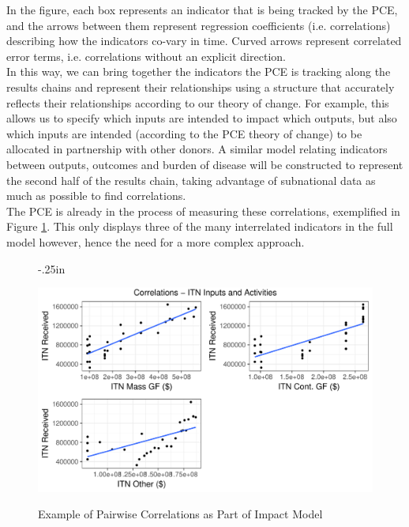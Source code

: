 \documentclass[twocolumn]{bmcart}%
\begin{document}
In the figure, each box represents an indicator that is being tracked by the PCE, and the arrows between them represent regression coefficients (i.e. correlations) describing how the indicators co-vary in time. Curved arrows represent correlated error terms, i.e. correlations without an explicit direction. \\

In this way, we can bring together the indicators the PCE is tracking along the results chains and represent their relationships using a structure that accurately reflects their relationships according to our theory of change. For example, this allows us to specify which inputs are intended to impact which outputs, but also which inputs are intended (according to the PCE theory of change) to be allocated in partnership with other donors. A similar model relating indicators between outputs, outcomes and burden of disease will be constructed to represent the second half of the results chain, taking advantage of subnational data as much as possible to find correlations. \\

The PCE is already in the process of measuring these correlations, exemplified in Figure \ref{fig3}. This only displays three of the many interrelated indicators in the full model however, hence the need for a more complex approach. \\

\begin{figure}[h]
  \advance\leftskip-.25in
  \caption{\textmd{Example of Pairwise Correlations as Part of Impact Model}}
  \includegraphics[scale=.375]{Pages_from_pilot_data_exploratory_graphs.pdf} \\
  \label{fig3}
\end{figure}
\end{document}
